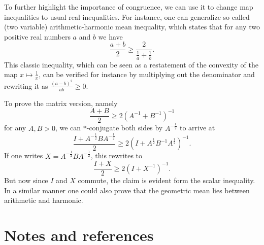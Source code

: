 To further highlight the importance of congruence, we can use it to change map inequalities to usual real inequalities. For instance, one can generalize so called (two variable) arithmetic-harmonic mean inequality, which states that for any two positive real numbers $a$ and $b$ we have
\[
	\frac{a + b}{2} \geq \frac{2}{\frac{1}{a} + \frac{1}{b}}.
\]
This classic inequality, which can be seen as a restatement of the convexity of the map $x \mapsto \frac{1}{x}$, can be verified for instance by multiplying out the denominator and rewriting it as $\frac{(a - b)^{2}}{ab} \geq 0$.

To prove the matrix version, namely
\[
	\frac{A + B}{2} \geq 2 (A^{-1} + B^{-1})^{-1}
\]
for any $A, B > 0$, we can $*$-conjugate both sides by $A^{-\frac{1}{2}}$ to arrive at
\[
	\frac{I + A^{-\frac{1}{2}}B A^{-\frac{1}{2}}}{2} \geq 2 (I + A^{\frac{1}{2}}B^{-1} A^{\frac{1}{2}})^{-1}.
\]
If one writes $X = A^{-\frac{1}{2}}B A^{-\frac{1}{2}}$, this rewrites to
\[
	\frac{I + X}{2} \geq 2 (I + X^{-1})^{-1}.
\]
But now since $I$ and $X$ commute, the claim is evident form the scalar inequality. In a similar manner one could also prove that the geometric mean lies between arithmetic and harmonic.

\section{Notes and references}

